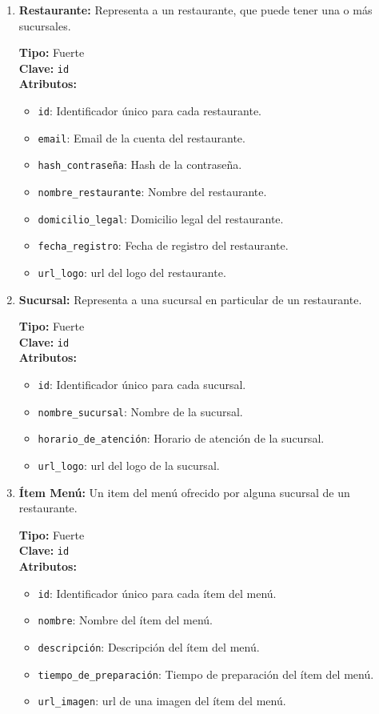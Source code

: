 \begin{enumerate}
    \item \textbf{Restaurante:} Representa a un restaurante, que puede tener una o más sucursales.
    
    \textbf{Tipo:} Fuerte \\
    \textbf{Clave:} \texttt{id} \\
    \textbf{Atributos:}
    \begin{itemize}
        \item \texttt{id}: Identificador único para cada restaurante.
        \item \texttt{email}: Email de la cuenta del restaurante.
        \item \texttt{hash\_contraseña}: Hash de la contraseña.
        \item \texttt{nombre\_restaurante}: Nombre del restaurante.
        \item \texttt{domicilio\_legal}: Domicilio legal del restaurante.
        \item \texttt{fecha\_registro}: Fecha de registro del restaurante.
        \item \texttt{url\_logo}: url del logo del restaurante.
    \end{itemize}
    
    \item \textbf{Sucursal:} Representa a una sucursal en particular de un restaurante.
    
    \textbf{Tipo:} Fuerte \\
    \textbf{Clave:} \texttt{id} \\
    \textbf{Atributos:}
    \begin{itemize}
        \item \texttt{id}: Identificador único para cada sucursal.
        \item \texttt{nombre\_sucursal}: Nombre de la sucursal.
        \item \texttt{horario\_de\_atención}: Horario de atención de la sucursal.
        \item \texttt{url\_logo}: url del logo de la sucursal.
    \end{itemize}
    
    \item \textbf{Ítem Menú:} Un item del menú ofrecido por alguna sucursal de un restaurante.
    
    \textbf{Tipo:} Fuerte \\
    \textbf{Clave:} \texttt{id} \\
    \textbf{Atributos:}
    \begin{itemize}
        \item \texttt{id}: Identificador único para cada ítem del menú.
        \item \texttt{nombre}: Nombre del ítem del menú.
        \item \texttt{descripción}: Descripción del ítem del menú.
        \item \texttt{tiempo\_de\_preparación}: Tiempo de preparación del ítem del menú.
        \item \texttt{url\_imagen}: url de una imagen del ítem del menú.
    \end{itemize}
    

\end{enumerate}
